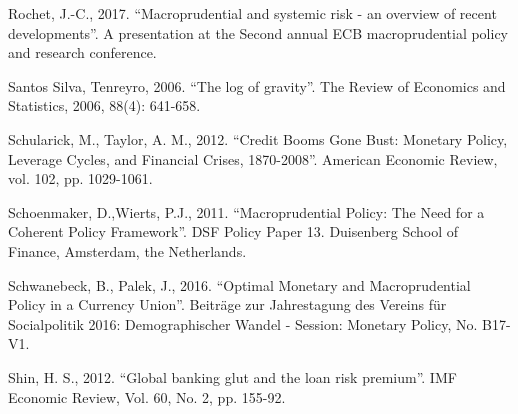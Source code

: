 \documentclass[12pt,a4paper]{article}
\begin{document}


Rochet, J.-C., 2017. “Macroprudential and systemic risk - an overview of recent developments”. A presentation at the Second annual ECB macroprudential policy and research conference. 

Santos Silva, Tenreyro, 2006. “The log of gravity”. The Review of Economics and Statistics, 2006, 88(4): 641-658.

Schularick, M., Taylor, A. M., 2012. “Credit Booms Gone Bust: Monetary Policy, Leverage Cycles, and Financial Crises, 1870-2008”. American Economic Review, vol. 102, pp. 1029-1061.

Schoenmaker, D.,Wierts, P.J., 2011. “Macroprudential Policy: The Need for a Coherent Policy Framework”. DSF Policy Paper 13. Duisenberg School of Finance, Amsterdam, the Netherlands.

Schwanebeck, B., Palek, J., 2016. “Optimal Monetary and Macroprudential Policy in a Currency Union”. Beiträge zur Jahrestagung des Vereins für Socialpolitik 2016: Demographischer Wandel - Session: Monetary Policy, No. B17-V1.

Shin, H. S., 2012. “Global banking glut and the loan risk premium”. IMF Economic Review, Vol. 60, No. 2, pp. 155-92.
\end{document}
